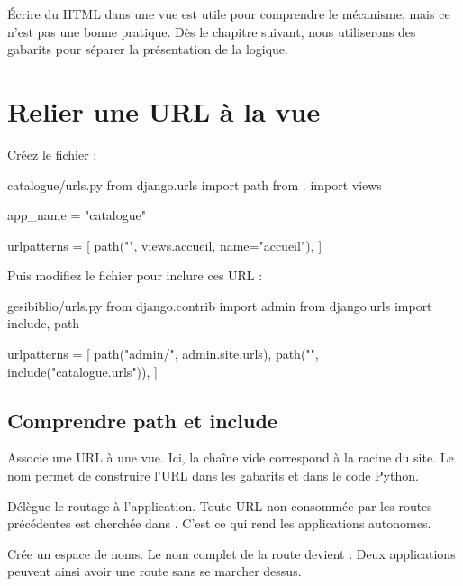 \begin{note}
Écrire du HTML dans une vue est utile pour comprendre le mécanisme, mais ce n'est
pas une bonne pratique. Dès le chapitre suivant, nous utiliserons des gabarits
pour séparer la présentation de la logique.
\end{note}

\section{Relier une URL à la vue}

Créez le fichier  :

\begin{codebox}[python]{catalogue/urls.py}
from django.urls import path
from . import views

app_name = "catalogue"

urlpatterns = [
    path("", views.accueil, name="accueil"),
]
\end{codebox}

Puis modifiez le fichier  pour inclure ces URL :

\begin{codebox}[python]{gesibiblio/urls.py}
from django.contrib import admin
from django.urls import include, path

urlpatterns = [
    path("admin/", admin.site.urls),
    path("", include("catalogue.urls")),
]
\end{codebox}

\subsection{Comprendre path et include}

\begin{description}[leftmargin=3.1cm,style=nextline]
  \item[\code{path("", vue, name="...")}] Associe une URL à une vue. Ici, la
  chaîne vide correspond à la racine du site. Le nom  permet de
  construire l'URL dans les gabarits et dans le code Python.
  \item[\code{include("catalogue.urls")}] Délègue le routage à l'application. Toute
  URL non consommée par les routes précédentes est cherchée dans
  . C'est ce qui rend les applications autonomes.
  \item[\code{app\_name = "catalogue"}] Crée un espace de noms. Le nom complet de
  la route devient . Deux applications peuvent ainsi avoir
  une route  sans se marcher dessus.
\end{description}


